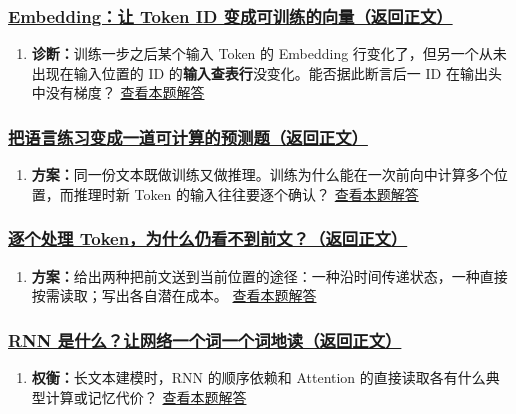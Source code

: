 \subsubsection*{\hyperref[check:20-embeddings]{Embedding：让 Token ID 变成可训练的向量（返回正文）}}\begin{enumerate}[label={},leftmargin=4.8em,itemsep=4pt]
\item[\textbf{C4-16.}] \label{exercise:C4-16}\label{extension:20-embeddings:4}\textbf{诊断：}训练一步之后某个输入 Token 的 Embedding 行变化了，但另一个从未出现在输入位置的 ID 的\textbf{输入查表行}没变化。能否据此断言后一 ID 在输出头中没有梯度？ \hyperref[answerpiece:20-embeddings:4]{查看本题解答}
\end{enumerate}

\subsubsection*{\hyperref[check:20b-task-contract]{把语言练习变成一道可计算的预测题（返回正文）}}\begin{enumerate}[label={},leftmargin=4.8em,itemsep=4pt]
\item[\textbf{C4-17.}] \label{exercise:C4-17}\label{extension:20b-task-contract:4}\textbf{方案：}同一份文本既做训练又做推理。训练为什么能在一次前向中计算多个位置，而推理时新 Token 的输入往往要逐个确认？ \hyperref[answerpiece:20b-task-contract:4]{查看本题解答}
\end{enumerate}

\subsubsection*{\hyperref[check:21a-context-gap]{逐个处理 Token，为什么仍看不到前文？（返回正文）}}\begin{enumerate}[label={},leftmargin=4.8em,itemsep=4pt]
\item[\textbf{C4-18.}] \label{exercise:C4-18}\label{extension:21a-context-gap:4}\textbf{方案：}给出两种把前文送到当前位置的途径：一种沿时间传递状态，一种直接按需读取；写出各自潜在成本。 \hyperref[answerpiece:21a-context-gap:4]{查看本题解答}
\end{enumerate}

\subsubsection*{\hyperref[check:21-rnn]{RNN 是什么？让网络一个词一个词地读（返回正文）}}\begin{enumerate}[label={},leftmargin=4.8em,itemsep=4pt]
\item[\textbf{C4-19.}] \label{exercise:C4-19}\label{extension:21-rnn:4}\textbf{权衡：}长文本建模时，RNN 的顺序依赖和 Attention 的直接读取各有什么典型计算或记忆代价？ \hyperref[answerpiece:21-rnn:4]{查看本题解答}
\end{enumerate}

